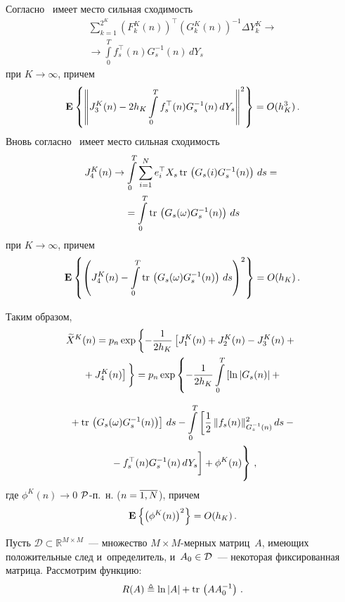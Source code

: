 \begin{multicols}{2}
{  Согласно~\cite{LS_74} имеет место сильная сходимость 
  \begin{multline*}
  \sum\limits_{k=1}^{2^K} \left(F_k^K(n)\right)^{\top}\left(G_k^K(n)\right)^{-1}
  \Delta Y^K_k \to{}\\
  {}\to \int\limits_0^T f_s^{\top}(n)G_s^{-1}(n)\,dY_s
  \end{multline*}
 при $K \to \infty$, причем~\cite{S_14}
 $$
 \mathbf{E}_{  }\left\{ \mathop{\left\|J_3^K(n) - 2h_K\int\limits_0^T f_s^{\top}(n)G_s^{-1}(n)\,dY_s\right\|^2} \right\}
 =O(h^3_K)\,.
 $$
 Вновь согласно~\cite{S_14} имеет место сильная сходимость
 \begin{multline*}
 J_4^K(n) \to \int\limits_0^T \sum\limits_{i=1}^N e^{\top}_iX_s \mathop{\mathrm{tr}}\,\left( G_s(i)
 G_s^{-1}(n)
 \right)\,ds = {}\\
 {}=\int\limits_0^T \mathop{\mathrm{tr}}\,\left( G_s(\omega) G_s^{-1}(n)\right)\,ds
 \end{multline*}
 при $K \to \infty$, причем 
 $$
 \mathbf{E}_{  }\left\{ \mathop{\left( J_4^K(n) - \int\limits_0^T \mathop{\mathrm{tr}}\,\left( G_s(\omega) G_s^{-1}(n)\right)\,ds
 \right)^2} \right\} = O(h_K)\,.
 $$

  Таким образом,
 \begin{multline*}
 \widetilde{X}^K(n) = p_n\exp\left\{
  -\fr{1}{2h_K}\left[
  J_1^K(n) + J_2^K(n) - J_3^K(n) +{}\right.\right.\\
 \left.\left. {}+ J_4^K(n)
    \right] \vphantom{\fr{1}{2h_K}}
  \right\}  =p_n\exp\left\{
  -\fr{1}{2h_K}
  \int\limits_0^T \left[ \ln|G_s(n)|+ {}\right.\right.
  \end{multline*}
  
\noindent
   \begin{multline}
\left.  {}+\try\left( G_s(\omega) 
  G_s^{-1}(n)\right)\right]\,ds
  -  \int\limits_0^T \left[
 \fr{1}{2}\,\|f_s(n)\|^2_{  G_s^{-1}(n)}\,ds -{}\right.\\
\left.\left. {}- f_s^{\top}(n)G_s^{-1}(n)\,dY_s
  \vphantom{\fr{1}{2}}
  \right] + \phi^K(n)
 \vphantom{\int\limits_0^T} \right\}\,,
  \label{eq:eqpr_1}
 \end{multline}
 где $\phi^K(n) \to 0$ ${\mathcal P}$-п.~н. ($n\hm=\overline{1,N}$), причем
 \begin{equation*}
 \mathbf{E}_{  }\left\{ \mathop{\left(\phi^K(n)\right)^2} \right\}=O(h_K)\,.
 \end{equation*}

 Пусть $\mathcal{D} \subset \mathbb{R}^{{M}\times{M}}$~--- 
 множество ${M}\times{M}$-мер\-ных мат\-риц~$A$, имеющих положительные след 
 и~определитель, и~$A_0 \hm\in \mathcal{D}$~--- некоторая фиксированная матрица. 
 Рас\-смот\-рим функцию:
 \begin{equation*}
 R(A) \triangleq \ln|A| + \mathop{\mathrm{tr}}\, \left(AA_0^{-1}\right)\,.
 \end{equation*}
 
}
\end{multicols}
